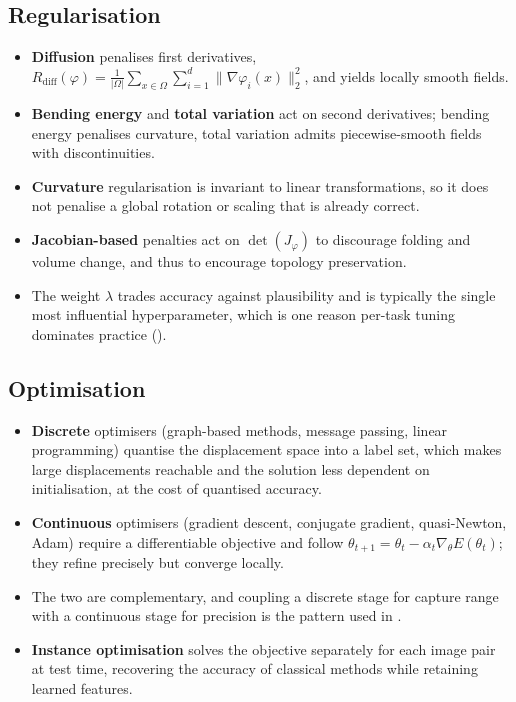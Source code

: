 \subsection{Regularisation}
\begin{itemize}
\item \textbf{Diffusion} penalises first derivatives, $R_{\mathrm{diff}}(\varphi) = \tfrac{1}{|\Omega|}\sum_{x \in \Omega} \sum_{i=1}^{d} \lVert \nabla \varphi_i(x) \rVert_2^2$, and yields locally smooth fields.
\item \textbf{Bending energy} and \textbf{total variation} act on second derivatives; bending energy penalises curvature, total variation admits piecewise-smooth fields with discontinuities.
\item \textbf{Curvature} regularisation is invariant to linear transformations, so it does not penalise a global rotation or scaling that is already correct.
\item \textbf{Jacobian-based} penalties act on $\det(J_\varphi)$ to discourage folding and volume change, and thus to encourage topology preservation.
\item The weight $\lambda$ trades accuracy against plausibility and is typically the single most influential hyperparameter, which is one reason per-task tuning dominates practice ().
\end{itemize}

\subsection{Optimisation}
\label{sec:bg-registration-optimisation}
\begin{itemize}
\item \textbf{Discrete} optimisers (graph-based methods, message passing, linear programming) quantise the displacement space into a label set, which makes large displacements reachable and the solution less dependent on initialisation, at the cost of quantised accuracy.
\item \textbf{Continuous} optimisers (gradient descent, conjugate gradient, quasi-Newton, Adam) require a differentiable objective and follow $\theta_{t+1} = \theta_t - \alpha_t \nabla_{\theta} E(\theta_t)$; they refine precisely but converge locally.
\item The two are complementary, and coupling a discrete stage for capture range with a continuous stage for precision is the pattern used in .
\item \textbf{Instance optimisation} solves the objective separately for each image pair at test time, recovering the accuracy of classical methods while retaining learned features.
\end{itemize}

